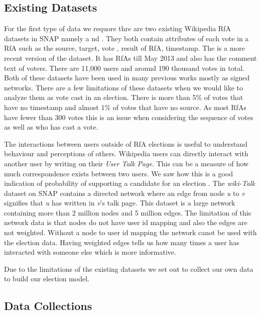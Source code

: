 \subsection{Existing Datasets}
For the first type of data we requore thre are two existing Wikipedia RfA datasets in SNAP namely \wikielect a
nd \wikirfa. They both contain attributes of each vote in a RfA such as the source, target, vote , result of RfA, timestamp. The \wikirfa is a more recent version of the \wikielect dataset. It has RfAs till May 2013 and also has the comment text of voters. There are 11,000 users and around 190 thousand votes in total. Both of these datasets have been used in many previous works mostly as signed networks. There are a few limitations of these datasets when we would like to analyze them as vote cast in an election. There is more than 5\% of \wikirfa votes that have no timestamp and almost 1\% of votes that have no source. As most RfAs have fewer than 300 votes this is an issue when considering the sequence of votes as well as who has cast a vote.
\smallskip

The interactions between users outside of RfA elections is useful to understand behaviour and perceptions of others. Wikipedia users can directly interact with another user by writing on their \textit{User Talk Page}. This can be a measure of how much correspondence exists between two users. We saw how this is a good indication of probability of supporting a candidate for an election \cite{leskovec2010governance}. The \textit{wiki-Talk} dataset on SNAP contains a directed network where an edge from node \textit{u} to \textit{v} signifies that \textit{u} has written in \textit{v}'s talk page. This dataset is a large network containing more than 2 million nodes and 5 million edges. The limitation of this network data is that nodes do not have user id mapping and also the edges are not weighted. Without a node to user id mapping the network canot be used with the election data. Having weighted edges tells us how many times a user has interacted with someone else which is more informative. 
\smallskip

Due to the limitations of the existing datasets we set out to collect our own data to build our election model.

\subsection{Data Collections}

